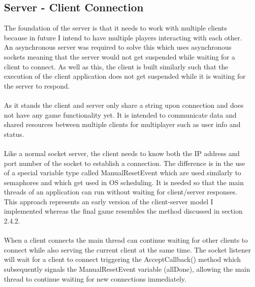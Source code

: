 \documentclass[a4paper]{report}
\begin{document}
\subsection{Server - Client Connection}
The foundation of the server is that it needs to work with multiple clients because in future I intend to have multiple players interacting with each other. An asynchronous server was required to solve this which uses asynchronous sockets meaning that the server would not get suspended while waiting for a client to connect. As well as this, the client is built similarly such that the execution of the client application does not get suspended while it is waiting for the server to respond.
\\\\
As it stands the client and server only share a string upon connection and does not have any game functionality yet. It is intended to communicate data and shared resources between multiple clients for multiplayer such as user info and status.
\\\\
Like a normal socket server, the client needs to know both the IP address and port number of the socket to establish a connection. The difference is in the use of a special variable type called ManualResetEvent which are used similarly to semaphores and which get used in OS scheduling. It is needed so that the main threads of an application can run without waiting for client/server responses. This approach represents an early version of the client-server model I implemented whereas the final game resembles the method discussed in section 2.4.2. \cite{MRE}
\\\\
When a client connects the main thread can continue waiting for other clients to connect while also serving the current client at the same time. The socket listener will wait for a client to connect triggering the AcceptCallback() method which subsequently signals the ManualResetEvent variable (allDone), allowing the main thread to continue waiting for new connections immediately. \cite{Server} 
\end{document}
